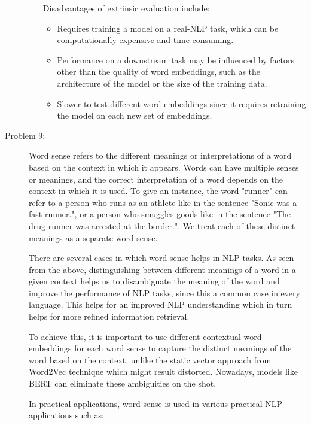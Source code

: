 \documentclass[12pt]{article}
\begin{document}
\begin{description}
\begin{enumerate}
  Disadvantages of extrinsic evaluation include:

  \begin{itemize}
    \item Requires training a model on a real-NLP task, which can be computationally expensive and time-consuming.
    \item Performance on a downstream task may be influenced by factors other than the quality of word embeddings, such as the architecture of the model or the size of the training data.
    \item Slower to test different word embeddings since it requires retraining the model on each new set of embeddings.
  \end{itemize}

  \end{enumerate}

  \pagebreak

  \item[Problem 9:] \hfill %
  
  Word sense refers to the different meanings or interpretations of a word based on the context in which it appears. Words can have multiple senses or meanings, and the correct
  interpretation of a word depends on the context in which it is used. To give an instance, the word "runner" can refer to a person who runs as an athlete like in the sentence 
  "Sonic was a fast runner.", or a person who smuggles goods like in the sentence "The drug runner was arrested at the border.". We treat each of these distinct meanings as a 
  separate word sense.

  There are several cases in which word sense helps in NLP tasks. As seen from the above, distinguishing between different meanings of a word in a given context helps us to 
  disambiguate the meaning of the word and improve the performance of NLP tasks, since this a common case in every language. This helps for an improved NLP understanding which in
  turn helps for more refined information retrieval.

  To achieve this, it is important to use different contextual word embeddings for each word sense to capture the distinct meanings of the word based on the context, unlike the static 
  vector approach from Word2Vec technique which might result distorted. Nowadays, models like BERT can eliminate these ambiguities on the shot.

  In practical applications, word sense is used in various practical NLP applications such as:


\end{description}
\end{document}
